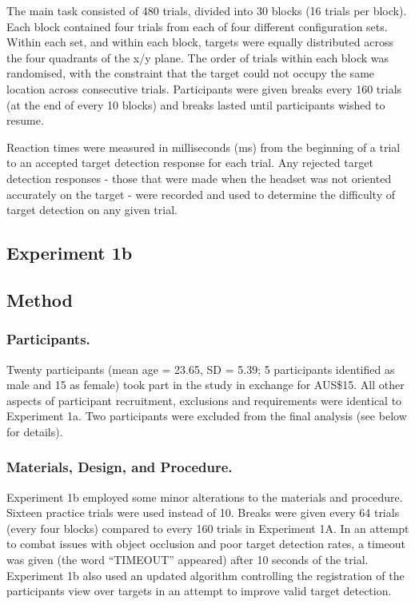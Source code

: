 \documentclass[
  english,
  man,floatsintext]{apa7}
\begin{document}
The main task consisted of 480 trials, divided into 30 blocks (16 trials per block). Each block contained four trials from each of four different configuration sets. Within each set, and within each block, targets were equally distributed across the four quadrants of the x/y plane. The order of trials within each block was randomised, with the constraint that the target could not occupy the same location across consecutive trials. Participants were given breaks every 160 trials (at the end of every 10 blocks) and breaks lasted until participants wished to resume.

Reaction times were measured in milliseconds (ms) from the beginning of a trial to an accepted target detection response for each trial. Any rejected target detection responses - those that were made when the headset was not oriented accurately on the target - were recorded and used to determine the difficulty of target detection on any given trial.

\hypertarget{experiment-1b}{%
\subsection{Experiment 1b}\label{experiment-1b}}

\hypertarget{method-1}{%
\subsection{Method}\label{method-1}}

\hypertarget{participants.-1}{%
\subsubsection{Participants.}\label{participants.-1}}

Twenty participants (mean age = 23.65, SD = 5.39; 5 participants identified as male and 15 as female) took part in the study in exchange for AUS\$15. All other aspects of participant recruitment, exclusions and requirements were identical to Experiment 1a. Two participants were excluded from the final analysis (see below for details).

\hypertarget{materials-design-and-procedure.}{%
\subsubsection{Materials, Design, and Procedure.}\label{materials-design-and-procedure.}}

Experiment 1b employed some minor alterations to the materials and procedure. Sixteen practice trials were used instead of 10. Breaks were given every 64 trials (every four blocks) compared to every 160 trials in Experiment 1A. In an attempt to combat issues with object occlusion and poor target detection rates, a timeout was given (the word ``TIMEOUT'' appeared) after 10 seconds of the trial. Experiment 1b also used an updated algorithm controlling the registration of the participants view over targets in an attempt to improve valid target detection.
\end{document}
